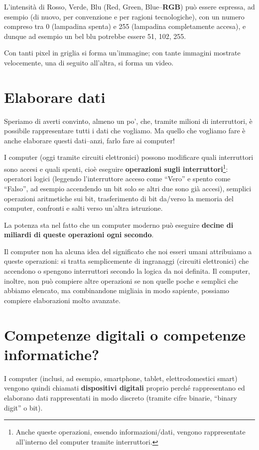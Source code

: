 L'intensità di Rosso, Verde, Blu (Red, Green, Blue--\textbf{RGB}) può essere espressa, ad esempio (di nuovo, per convenzione e per ragioni tecnologiche), con un numero compreso tra 0 (lampadina spenta) e 255 (lampadina completamente accesa), e dunque ad esempio un bel blu potrebbe essere 51, 102, 255.

Con tanti pixel in griglia si forma un'immagine; con tante immagini mostrate velocemente, una di seguito all'altra, si forma un video.

\section{Elaborare dati }\label{elaborare-dati}

Speriamo di averti convinto, almeno un po', che, tramite milioni di interruttori, è possibile rappresentare tutti i dati che vogliamo. Ma quello che vogliamo fare è anche elaborare questi dati--anzi, farlo fare ai computer!

I computer (oggi tramite circuiti elettronici) possono modificare quali interruttori sono accesi e quali spenti, cioè eseguire \textbf{operazioni sugli interruttori}\footnote{Anche queste operazioni, essendo informazioni/dati, vengono rappresentate all'interno del computer tramite interruttori.}: operatori logici (leggendo l'interruttore acceso come ``Vero'' e spento come ``Falso'', ad esempio accendendo un bit solo se altri due sono già accesi), semplici operazioni aritmetiche sui bit, trasferimento di bit da/verso la memoria del computer, confronti e salti verso un'altra istruzione.

La potenza sta nel fatto che un computer moderno può eseguire \textbf{decine di miliardi di queste operazioni ogni secondo}.

Il computer non ha alcuna idea del significato che noi esseri umani attribuiamo a queste operazioni: si tratta semplicemente di ingranaggi (circuiti elettronici) che accendono o spengono interruttori secondo la logica da noi definita. Il computer, inoltre, non può compiere altre operazioni se non quelle poche e semplici che abbiamo elencato, ma combinandone migliaia in modo sapiente, possiamo compiere elaborazioni molto avanzate.


\section{Competenze digitali o competenze informatiche?}

I computer (inclusi, ad esempio, smartphone, tablet, elettrodomestici smart) vengono quindi chiamati \textbf{dispositivi digitali} proprio perché rappresentano ed elaborano dati rappresentati in modo discreto (tramite cifre binarie, ``binary digit'' o bit).

